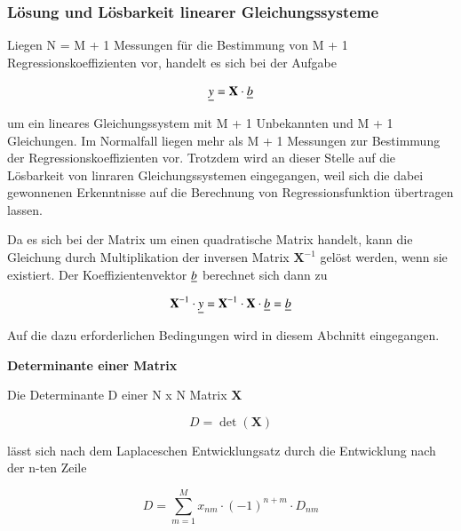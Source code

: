 \subsubsection{L\"{o}sung und L\"{o}sbarkeit linearer Gleichungssysteme}

\noindent Liegen N = M + 1 Messungen f\"{u}r die Bestimmung von M + 1 Regressionskoeffizienten vor, handelt es sich bei der Aufgabe

\begin{equation}\label{eq:thirteenninetynine}
\underline{y}=\mathbf{X}\cdot \underline{b}
\end{equation}

\noindent um ein lineares Gleichungssystem mit M + 1 Unbekannten und M + 1 Gleichungen. Im Normalfall liegen mehr als M + 1 Messungen zur Bestimmung der Regressionskoeffizienten vor. Trotzdem wird an dieser Stelle auf die L\"{o}sbarkeit von linraren Gleichungssystemen eingegangen, weil sich die dabei gewonnenen Erkenntnisse auf die Berechnung von Regressionsfunktion \"{u}bertragen lassen.\newline

\noindent Da es sich bei der Matrix um einen quadratische Matrix handelt, kann die Gleichung durch Multiplikation der inversen Matrix $\mathbf{X}^{-1}$ gel\"{o}st werden, wenn sie existiert. Der Koeffizientenvektor $\underline{b}$ berechnet sich dann zu

\begin{equation}\label{eq:thirteenonehundred}
\mathbf{X}^{-1} \cdot \underline{y}=\mathbf{X}^{-1} \cdot \mathbf{X}\cdot \underline{b}=\underline{b}
\end{equation}

\noindent Auf die dazu erforderlichen Bedingungen wird in diesem Abchnitt eingegangen.\bigskip

\selectfont
\noindent\textbf{Determinante einer Matrix} \smallskip

\noindent Die Determinante D einer N x N Matrix $\mathbf{X}$

\begin{equation}\label{eq:thirteenonehundredone}
D=\det (\mathbf{X})
\end{equation}

\noindent l\"{a}sst sich nach dem Laplaceschen Entwicklungsatz durch die Entwicklung nach der n-ten Zeile

\begin{equation}\label{eq:thirteenonehundredtwo}
D=\sum _{m=1}^{M}x_{nm} \cdot (-1)^{n+m} \cdot D_{nm}
\end{equation}

